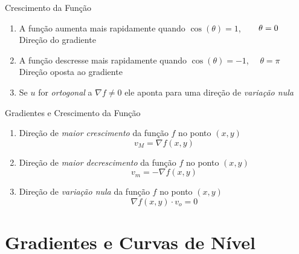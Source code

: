 \documentclass[fleqn,utf8,aspectratio=169,12pt]{beamer}
\begin{document}
\begin{proofframe}{Crescimento da Função}
\begin{enumerate}
  \setlength\itemsep{1.5em}
  \item A função aumenta mais rapidamente quando
        \pause
        \tabto{82mm}\emph{$\cos(\theta)=1$},
        \pause
        \emph{$\hphantom{-}\quad\theta=0$} \\[2mm]
        \pause
        Direção do gradiente
        \pause
  \item A função descresse mais rapidamente quando
        \pause
        \tabto{82mm}\emph{$\cos(\theta)=-1$},
        \pause
        \emph{$\quad\theta=\pi$} \\[2mm]
        \pause
        Direção oposta ao gradiente
        \pause
  \item Se $u$ for \emph{ortogonal} a \(\nabla f\neq 0\)
        \pause
        ele aponta para uma direção de \emph{variação nula}
\end{enumerate}
\end{proofframe}

\begin{frame}{Gradientes e Crescimento da Função}
  \begin{enumerate}[<+->]
    \setlength\itemsep{1.5em}
    \item Direção de \emph{maior crescimento} da função $f$ no ponto \((x, y)\)
          \[
            v_M = \nabla f(x, y)
          \]
    \item Direção de \emph{maior decrescimento} da função $f$ no ponto \((x, y)\)
          \[
            v_m = -\nabla f(x, y)
          \]
    \item Direção de \emph{variação nula} da função $f$ no ponto \((x, y)\)
          \[
            \nabla f(x, y) \cdot v_o  = 0
          \]
  \end{enumerate}
\end{frame}



\section{Gradientes e Curvas de Nível}
\end{document}
